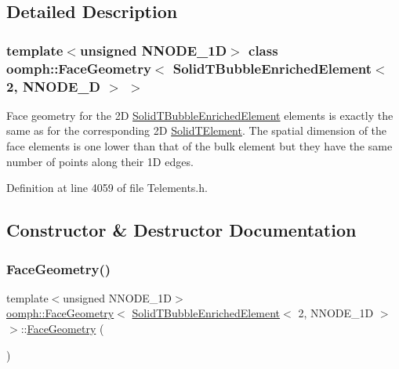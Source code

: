 \subsection{Detailed Description}
\subsubsection*{template$<$unsigned N\+N\+O\+D\+E\+\_\+1D$>$\newline
class oomph\+::\+Face\+Geometry$<$ Solid\+T\+Bubble\+Enriched\+Element$<$ 2, N\+N\+O\+D\+E\+\_\+D $>$ $>$}

Face geometry for the 2D \hyperlink{classoomph_1_1SolidTBubbleEnrichedElement}{Solid\+T\+Bubble\+Enriched\+Element} elements is exactly the same as for the corresponding 2D \hyperlink{classoomph_1_1SolidTElement}{Solid\+T\+Element}. The spatial dimension of the face elements is one lower than that of the bulk element but they have the same number of points along their 1D edges. 

Definition at line 4059 of file Telements.\+h.



\subsection{Constructor \& Destructor Documentation}
\mbox{\label{classoomph_1_1FaceGeometry_3_01SolidTBubbleEnrichedElement_3_012_00_01NNODE__1D_01_4_01_4_a057fde1846701a11833f6606a775131b}} 
\subsubsection{\texorpdfstring{Face\+Geometry()}{FaceGeometry()}}
{\footnotesize\ttfamily template$<$unsigned N\+N\+O\+D\+E\+\_\+1D$>$ \\
\hyperlink{classoomph_1_1FaceGeometry}{oomph\+::\+Face\+Geometry}$<$ \hyperlink{classoomph_1_1SolidTBubbleEnrichedElement}{Solid\+T\+Bubble\+Enriched\+Element}$<$ 2, N\+N\+O\+D\+E\+\_\+1D $>$ $>$\+::\hyperlink{classoomph_1_1FaceGeometry}{Face\+Geometry} (\begin{DoxyParamCaption}{ }\end{DoxyParamCaption})\hspace{0.3cm}{\ttfamily [inline]}}



